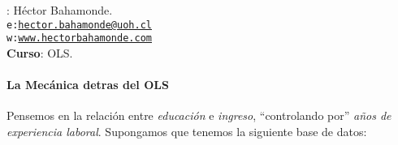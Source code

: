 \documentclass[10pt]{article}
\begin{document}


\thispagestyle{fancy} %





\hspace{-5mm}{\bf Profesor}: H\'ector Bahamonde.\\
\texttt{e:}\href{mailto:hector.bahamonde@uoh.cl}{\texttt{hector.bahamonde@uoh.cl}}\\
\texttt{w:}\href{http://www.hectorbahamonde.com}{\texttt{www.hectorbahamonde.com}}\\
{\bf Curso}: OLS.


\paragraph{La Mec\'anica detras del OLS} Pensemos en la relaci\'on entre \emph{educaci\'on} e \emph{ingreso}, ``controlando por'' \emph{a\~nos de experiencia laboral}. Supongamos que tenemos la siguiente base de datos:
\end{document}
